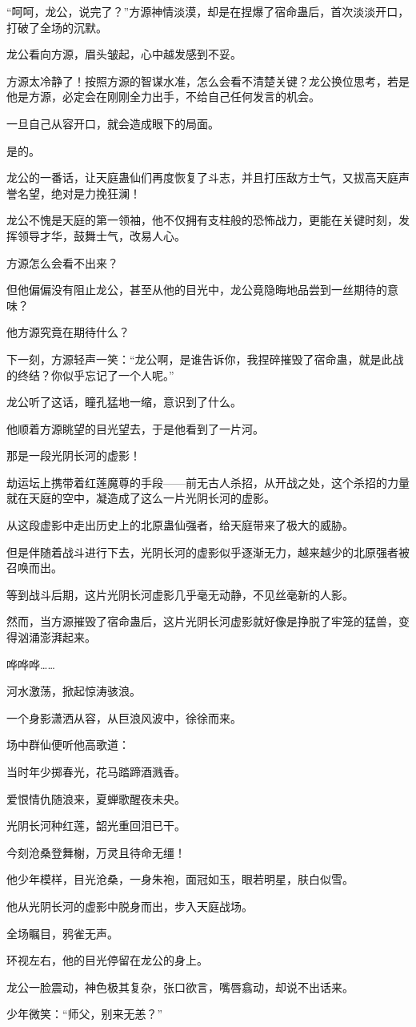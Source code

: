 \begin{this_body}
“呵呵，龙公，说完了？”方源神情淡漠，却是在捏爆了宿命蛊后，首次淡淡开口，打破了全场的沉默。

龙公看向方源，眉头皱起，心中越发感到不妥。

方源太冷静了！按照方源的智谋水准，怎么会看不清楚关键？龙公换位思考，若是他是方源，必定会在刚刚全力出手，不给自己任何发言的机会。

一旦自己从容开口，就会造成眼下的局面。

是的。

龙公的一番话，让天庭蛊仙们再度恢复了斗志，并且打压敌方士气，又拔高天庭声誉名望，绝对是力挽狂澜！

龙公不愧是天庭的第一领袖，他不仅拥有支柱般的恐怖战力，更能在关键时刻，发挥领导才华，鼓舞士气，改易人心。

方源怎么会看不出来？

但他偏偏没有阻止龙公，甚至从他的目光中，龙公竟隐晦地品尝到一丝期待的意味？

他方源究竟在期待什么？

下一刻，方源轻声一笑：“龙公啊，是谁告诉你，我捏碎摧毁了宿命蛊，就是此战的终结？你似乎忘记了一个人呢。”

龙公听了这话，瞳孔猛地一缩，意识到了什么。

他顺着方源眺望的目光望去，于是他看到了一片河。

那是一段光阴长河的虚影！

劫运坛上携带着红莲魔尊的手段——前无古人杀招，从开战之处，这个杀招的力量就在天庭的空中，凝造成了这么一片光阴长河的虚影。

从这段虚影中走出历史上的北原蛊仙强者，给天庭带来了极大的威胁。

但是伴随着战斗进行下去，光阴长河的虚影似乎逐渐无力，越来越少的北原强者被召唤而出。

等到战斗后期，这片光阴长河虚影几乎毫无动静，不见丝毫新的人影。

然而，当方源摧毁了宿命蛊后，这片光阴长河虚影就好像是挣脱了牢笼的猛兽，变得汹涌澎湃起来。

哗哗哗……

河水激荡，掀起惊涛骇浪。

一个身影潇洒从容，从巨浪风波中，徐徐而来。

场中群仙便听他高歌道：

当时年少掷春光，花马踏蹄酒溅香。

爱恨情仇随浪来，夏蝉歌醒夜未央。

光阴长河种红莲，韶光重回泪已干。

今刻沧桑登舞榭，万灵且待命无缰！

他少年模样，目光沧桑，一身朱袍，面冠如玉，眼若明星，肤白似雪。

他从光阴长河的虚影中脱身而出，步入天庭战场。

全场瞩目，鸦雀无声。

环视左右，他的目光停留在龙公的身上。

龙公一脸震动，神色极其复杂，张口欲言，嘴唇翕动，却说不出话来。

少年微笑：“师父，别来无恙？”

\end{this_body}


